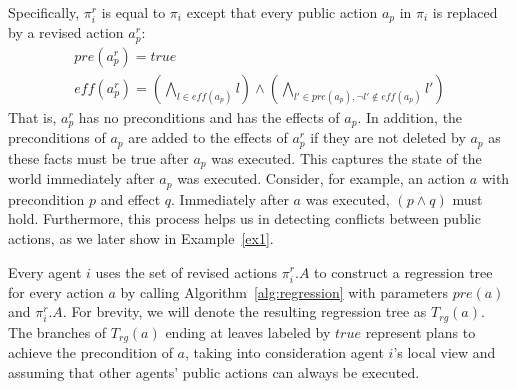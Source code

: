 \documentclass[letterpaper]{article}
\newcommand{\eff}{\textit{eff}}
\newcommand{\pre}{\textit{pre}}
\theoremstyle{definition}
\begin{document}
Specifically, $\pi_i^r$ is equal to $\pi_i$ except that every public action $a_p$ in $\pi_i$ is replaced by a revised action $a^r_p$:
\begin{eqnarray}
& \pre(a^r_p)=true &\\
& \eff(a^r_p)=\displaystyle\left(\bigwedge_{l \in \eff(a_p)}l\right) \wedge \left(\bigwedge_{l' \in \pre(a_p), \neg l' \not\in \eff(a_p)}l'\right)&
\end{eqnarray}
That is, $a^r_p$ has no preconditions and has the effects of $a_p$. 
In addition, the preconditions of $a_p$ are added to the effects of $a^r_p$ if they are not deleted by $a_p$ as these facts must be true after $a_p$ was executed. 
This captures the state of the world immediately after $a_p$ was executed. Consider, for example, an action $a$ with precondition $p$ and effect $q$. Immediately after $a$ was executed, $(p \wedge q)$ must hold. Furthermore, this process helps us in detecting conflicts between public actions, as we later show in Example~\ref{ex1}.


Every agent $i$ uses the set of revised actions $\pi_i^r.A$ to construct a regression tree for every action $a$ by calling Algorithm~\ref{alg:regression} with parameters $\pre(a)$ and $\pi_i^r.A$. For brevity, we will denote the resulting regression tree as $T_{rg}(a)$. The branches of $T_{rg}(a)$ ending at leaves labeled by $true$ represent plans to achieve the precondition of $a$, taking into consideration agent $i$'s local view and assuming that other agents' public actions can always be executed. 
\end{document}

